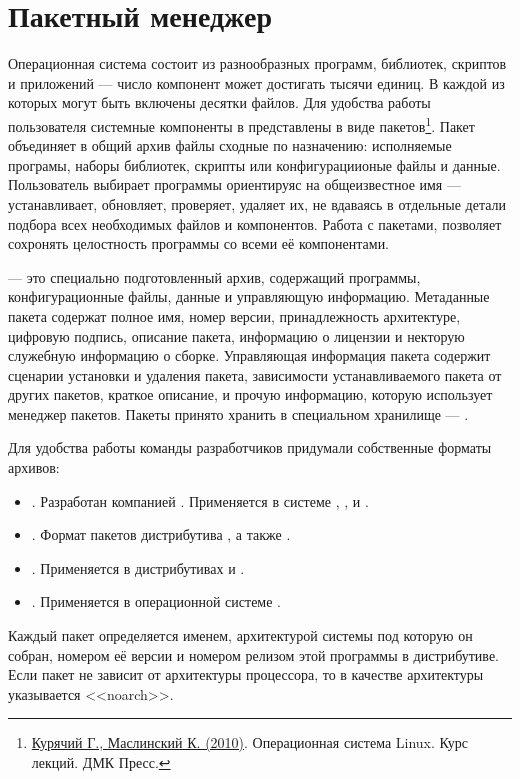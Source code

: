 \chapter{Пакетный менеджер}\label{package-manager}
Операционная система состоит из разнообразных программ, библиотек, скриптов и приложений --- 
число компонент может достигать тысячи единиц. В каждой из которых могут быть включены десятки файлов. 
Для удобства работы пользователя системные компоненты в  представлены в виде 
пакетов\footnote{\href{https://docs.altlinux.org/books/altlibrary-linuxintro2.pdf}{Курячий Г., Маслинский К. (2010)}. 
Операционная система Linux. Курс лекций. ДМК Пресс.}. Пакет объединяет в общий архив файлы сходные
по назначению: исполняемые програмы, наборы библиотек, скрипты или конфигурациионые файлы и данные.
Пользователь выбирает программы ориентируяс на общеизвестное имя --- устанавливает, обновляет, проверяет,
удаляет их, не вдаваясь в отдельные детали подбора всех необходимых файлов и компонентов.
Работа с пакетами, позволяет сохронять целостность программы со всеми её компонентами.

 --- это специально подготовленный архив, содержащий программы, конфигурационные файлы, 
данные и управляющую информацию. Метаданные пакета содержат полное имя, номер версии, принадлежность
архитектуре, цифровую подпись, описание пакета, информацию о лицензии и некторую служебную информацию
о сборке. Управляющая информация пакета содержит сценарии установки и удаления пакета,  зависимости
устанавливаемого пакета от других пакетов, краткое описание,  и прочую информацию, которую использует
менеджер пакетов. Пакеты принято хранить в специальном хранилище --- .

Для удобства работы команды разработчиков придумали собственные форматы архивов:

\begin{itemize}
	\item {}. Разработан компанией . Применяется в системе , ,  и .
	\item {}. Формат пакетов дистрибутива , а также .
	\item {}. Применяется в дистрибутивах  и .
	\item {}. Применяется в операционной системе .
\end{itemize}

Каждый пакет определяется именем, архитектурой системы под которую он собран,
номером её версии и номером релизом этой программы в дистрибутиве. Если пакет не зависит
от архитектуры процессора, то в качестве архитектуры указывается <<noarch>>.

